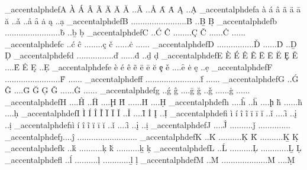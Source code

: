 {\brl@document_accentalphdef{A} {À} {Á} {Â} {Ã} {Ä} {Ā} {Ă} {..}{Ǎ} {..}{Å} {Ȃ} {Ȧ} {Ą} {..}{Ạ}
\brl@document_accentalphdef{a} {à} {á} {â} {ã} {ä} {ā} {ă} {..}{ǎ} {..}{å} {ȃ} {ȧ} {ą} {..}{ạ}
\brl@document_accentalphdef{B} {..}{..}{..}{..}{..}{..}{..}{..}{..}{..}{..}{..}{Ḃ} {..}{Ḇ} {Ḅ}
\brl@document_accentalphdef{b} {..}{..}{..}{..}{..}{..}{..}{..}{..}{..}{..}{..}{ḃ} {..}{ḇ} {ḅ}
\brl@document_accentalphdef{C} {..}{Ć} {Ĉ} {..}{..}{..}{..}{Ç} {Č} {..}{..}{..}{Ċ} {..}{..}{..}
\brl@document_accentalphdef{c} {..}{ć} {ĉ} {..}{..}{..}{..}{ç} {č} {..}{..}{..}{ċ} {..}{..}{..}
\brl@document_accentalphdef{D} {..}{..}{..}{..}{..}{..}{..}{..}{Ď} {..}{..}{..}{Ḋ} {..}{Ḏ} {Ḍ}
\brl@document_accentalphdef{d} {..}{..}{..}{..}{..}{..}{..}{..}{ď} {..}{..}{..}{ḋ} {..}{ḏ} {ḍ}
\brl@document_accentalphdef{E} {È} {É} {Ê} {Ẽ} {Ë} {Ē} {Ĕ} {Ȩ} {Ě} {..}{..}{Ȇ} {Ė} {Ę} {..}{Ẹ}
\brl@document_accentalphdef{e} {è} {é} {ê} {ẽ} {ë} {ē} {ĕ} {ȩ} {ě} {..}{..}{ȇ} {ė} {ę} {..}{ẹ}
\brl@document_accentalphdef{F} {..}{..}{..}{..}{..}{..}{..}{..}{..}{..}{..}{..}{Ḟ} {..}{..}{..}
\brl@document_accentalphdef{f} {..}{..}{..}{..}{..}{..}{..}{..}{..}{..}{..}{..}{ḟ} {..}{..}{..}
\brl@document_accentalphdef{G} {..}{Ǵ} {Ĝ} {..}{..}{Ḡ} {Ğ} {Ģ} {Ǧ} {..}{..}{..}{Ġ} {..}{..}{..}
\brl@document_accentalphdef{g} {..}{ǵ} {ĝ} {..}{..}{ḡ} {ğ} {..}{ǧ} {..}{..}{..}{ġ} {..}{..}{..}
\brl@document_accentalphdef{H} {..}{..}{Ĥ} {..}{Ḧ} {..}{..}{Ḩ} {Ȟ} {..}{..}{..}{Ḣ} {..}{..}{Ḥ}
\brl@document_accentalphdef{h} {..}{..}{ĥ} {..}{ḧ} {..}{..}{ḩ} {ȟ} {..}{..}{..}{ḣ} {..}{..}{ḥ}
\brl@document_accentalphdef{I} {Ì} {Í} {Î} {Ĩ} {Ï} {Ī} {Ĭ} {..}{Ǐ} {..}{..}{Ȋ} {İ} {Į} {..}{Ị}
\brl@document_accentalphdef{i} {ì} {í} {î} {ĩ} {ï} {ī} {ĭ} {..}{ǐ} {..}{..}{ȋ} {..}{į} {..}{ị}
\brl@document_accentalphdef{\i}{ì} {í} {î} {ĩ} {ï} {ī} {ĭ} {..}{ǐ} {..}{..}{ȋ} {..}{į} {..}{ị}
\brl@document_accentalphdef{J} {..}{..}{Ĵ} {..}{..}{..}{..}{..}{ǰ} {..}{..}{..}{..}{..}{..}{..}
\brl@document_accentalphdef{\j}{..}{..}{ĵ} {..}{..}{..}{..}{..}{..}{..}{..}{..}{..}{..}{..}{..}
\brl@document_accentalphdef{K} {..}{Ḱ} {..}{..}{..}{..}{..}{Ķ} {Ǩ} {..}{..}{..}{..}{..}{Ḵ} {Ḳ}
\brl@document_accentalphdef{k} {..}{ḱ} {..}{..}{..}{..}{..}{ķ} {ǩ} {..}{..}{..}{..}{..}{ḵ} {ḳ}
\brl@document_accentalphdef{L} {..}{Ĺ} {..}{..}{..}{..}{..}{Ļ} {..}{..}{..}{..}{..}{..}{Ḻ} {Ḷ}
\brl@document_accentalphdef{l} {..}{ĺ} {..}{..}{..}{..}{..}{ļ} {..}{..}{..}{..}{..}{..}{ḻ} {ḷ}
\brl@document_accentalphdef{M} {..}{Ḿ} {..}{..}{..}{..}{..}{..}{..}{..}{..}{..}{Ṁ} {..}{..}{Ṃ}
}
